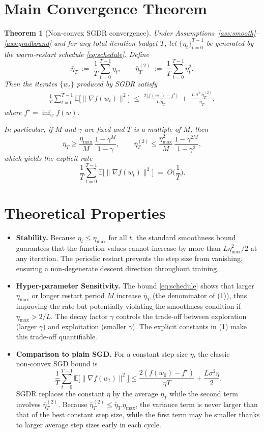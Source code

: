 \documentclass[11pt]{article}
\newtheorem{theorem}{Theorem}
\newcommand{\E}{\mathbb{E}}
\begin{document}
\section*{Main Convergence Theorem}
\begin{theorem}[Non‑convex SGDR convergence]\label{thm:sgdr}
Under Assumptions~\ref{ass:smooth}–\ref{ass:gradbound} and for any total iteration budget $T$, let $\{\eta_t\}_{t=0}^{T-1}$ be generated by the warm‑restart schedule \eqref{eq:schedule}. Define
\[
\bar\eta_T\;:=\;\frac{1}{T}\sum_{t=0}^{T-1}\eta_t,\qquad
\bar\eta_T^{(2)}\;:=\;\frac{1}{T}\sum_{t=0}^{T-1}\eta_t^{2}.
\]
Then the iterates $\{w_t\}$ produced by SGDR satisfy
\begin{align}
\frac{1}{T}\sum_{t=0}^{T-1}\E\big[\|\nabla f(w_t)\|^{2}\big]
\;\le\;
\frac{2\big(f(w_0)-f^{\star}\big)}{L\,\bar\eta_T}
\;+\;
\frac{L\,\sigma^{2}\,\bar\eta_T^{(2)}}{\bar\eta_T},
\tag{1}
\end{align}
where $f^{\star}=\inf_{w}f(w)$.  

In particular, if $M$ and $\gamma$ are fixed and $T$ is a multiple of $M$, then
\[
\bar\eta_T\ge \frac{\eta_{\max}}{M}\,\frac{1-\gamma^{M}}{1-\gamma},
\qquad
\bar\eta_T^{(2)}\le \frac{\eta_{\max}^{2}}{M}\,\frac{1-\gamma^{2M}}{1-\gamma^{2}},
\]
which yields the explicit rate
\[
\frac{1}{T}\sum_{t=0}^{T-1}\E\big[\|\nabla f(w_t)\|^{2}\big]
\;=\;O\!\Big(\frac{1}{T}\Big).
\tag{2}
\]
\end{theorem}

\section*{Theoretical Properties}
\begin{itemize}
\item \textbf{Stability.} Because $\eta_t\le\eta_{\max}$ for all $t$, the standard smoothness bound guarantees that the function values cannot increase by more than $L\eta_{\max}^{2}/2$ at any iteration. The periodic restart prevents the step size from vanishing, ensuring a non‑degenerate descent direction throughout training.
\item \textbf{Hyper‑parameter Sensitivity.} The bound \eqref{eq:schedule} shows that larger $\eta_{\max}$ or longer restart period $M$ increase $\bar\eta_T$ (the denominator of (1)), thus improving the rate but potentially violating the smoothness condition if $\eta_{\max}>2/L$. The decay factor $\gamma$ controls the trade‑off between exploration (larger $\gamma$) and exploitation (smaller $\gamma$). The explicit constants in (1) make this trade‑off quantifiable.
\item \textbf{Comparison to plain SGD.} For a constant step size $\eta$, the classic non‑convex SGD bound is
\[
\frac{1}{T}\sum_{t=0}^{T-1}\E\big[\|\nabla f(w_t)\|^{2}\big]\le
\frac{2(f(w_0)-f^{\star})}{\eta T}+\frac{L\sigma^{2}\eta}{2}.
\]
SGDR replaces the constant $\eta$ by the average $\bar\eta_T$ while the second term involves $\bar\eta_T^{(2)}$. Because $\bar\eta_T^{(2)}\le\bar\eta_T\,\eta_{\max}$, the variance term is never larger than that of the best constant step size, while the first term may be smaller thanks to larger average step sizes early in each cycle.
\end{itemize}
\end{document}

